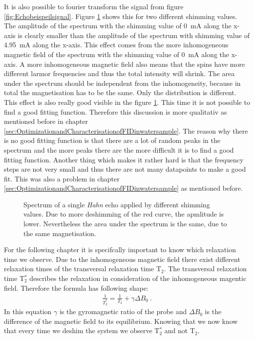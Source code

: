 It is also possible to fourier transform the signal from figure \ref{fig:Echobeispeilsignal}. Figure \ref{fig:SpinEcho} shows this for two different shimming values. The amplitude of the spectrum with the shimming value of \SI{0}{\milli \ampere} along the x-axis is clearly smaller than the amplitude of the spectrum with shimming value of \SI{4.95}{\milli \ampere} along the x-axis. This effect comes from the more inhomogeneous magnetic field of the spectrum with the shimming value of \SI{0}{\milli \ampere} along the x-axis. A more inhomogeneous magnetic field also means that the spins have more different larmor frequencies and thus the total intensity will shrink. The area under the spectrum should be independent from the inhomogeneity, because in total the magnetisation has to be the same. Only the distribution is different. This effect is also really good visible in the figure \ref{fig:SpinEcho}. This time it is not possible to find a good fitting function. Therefore this discussion is more qualitativ as mentioned before in chapter \ref{sec:OptimizationandCharacterisationofFIDinwatersample}. The reason why there is no good fitting function is that there are a lot of random peaks in the spectrum and the more peaks there are the more difficult it is to find a good fitting function. Another thing which makes it rather hard is that the frequency steps are not very small and thus there are not many datapoints to make a good fit. This was also a problem in chapter \ref{sec:OptimizationandCharacterisationofFIDinwatersample} as mentioned before.
\begin{figure}[H]
    \centering
    
    \caption[Spectrum of a single \textit{Hahn} echo applied by different shimming values.]{Spectrum of a single \textit{Hahn} echo applied by different shimming values. Due to more deshimming of the red curve, the apmlitude is lower. Nevertheless the area under the spectrum is the same, due to the same magnetisation.}
    \label{fig:SpinEcho}
\end{figure}
For the following chapter it is specifcally important to know which relaxation time we observe. Due to the inhomogeneous magnetic field there exist different relaxation times of the transversal relaxation time T$_2$. The transversal relaxation time T$_2^*$ describes the relaxation in consideration of the inhomogeneous magentic field. Therefore the formula has following shape:
\begin{align}
    \frac{1}{T_2^*} = \frac{1}{T_2} + \gamma \Delta B_0 \ .
    \label{eq:T2_star}
\end{align}
In this equation $\gamma$ is the gyromagnetic ratio of the probe and $\Delta B_0$ is the difference of the magnetic field to its equilibrium. Knowing that we now know that every time we deshim the system we observe T$_2^*$ and not T$_2$.
